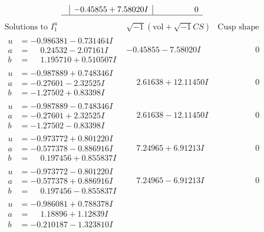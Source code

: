 \documentclass[1p]{elsarticle_modified}
\theoremstyle{definition}
\newcommand{\I}{\sqrt{-1}}
\begin{document}
$$\begin{array}{c|c|c}
 & -0.45855 + 7.58020 I & \phantom{-0.000000 } 0\\
 \hline 
 \end{array}$$\newpage$$\begin{array}{c|c|c}  
\text{Solutions to }I^u_{1}& \I (\text{vol} + \sqrt{-1}CS) & \text{Cusp shape}\\
 \hline 
\begin{aligned}
u &= -0.986381 - 0.731464 I \\
a &= \phantom{-}0.24532 - 2.07161 I \\
b &= \phantom{-}1.195710 + 0.510507 I\end{aligned}
 & -0.45855 - 7.58020 I & \phantom{-0.000000 } 0 \\ \hline\begin{aligned}
u &= -0.987889 + 0.748346 I \\
a &= -0.27601 - 2.32525 I \\
b &= -1.27502 + 0.83398 I\end{aligned}
 & \phantom{-}2.61638 + 12.11450 I & \phantom{-0.000000 } 0 \\ \hline\begin{aligned}
u &= -0.987889 - 0.748346 I \\
a &= -0.27601 + 2.32525 I \\
b &= -1.27502 - 0.83398 I\end{aligned}
 & \phantom{-}2.61638 - 12.11450 I & \phantom{-0.000000 } 0 \\ \hline\begin{aligned}
u &= -0.973772 + 0.801220 I \\
a &= -0.577378 - 0.886916 I \\
b &= \phantom{-}0.197456 + 0.855837 I\end{aligned}
 & \phantom{-}7.24965 + 6.91213 I & \phantom{-0.000000 } 0 \\ \hline\begin{aligned}
u &= -0.973772 - 0.801220 I \\
a &= -0.577378 + 0.886916 I \\
b &= \phantom{-}0.197456 - 0.855837 I\end{aligned}
 & \phantom{-}7.24965 - 6.91213 I & \phantom{-0.000000 } 0 \\ \hline\begin{aligned}
u &= -0.986081 + 0.788378 I \\
a &= \phantom{-}1.18896 + 1.12839 I \\
b &= -0.210187 - 1.323810 I\end{aligned}

\end{array}$$
\end{document}
